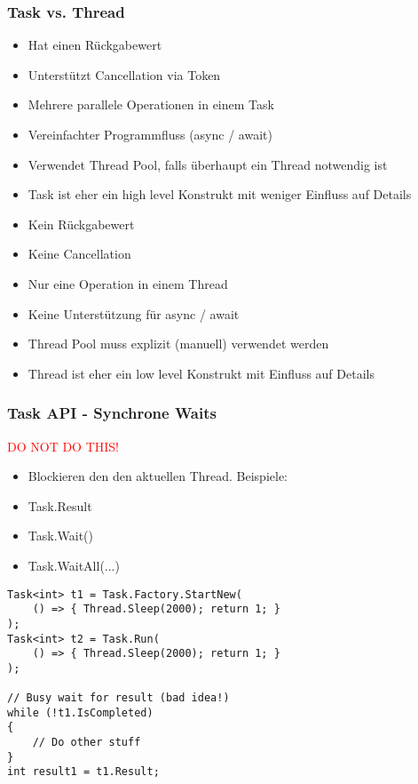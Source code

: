 \begin{multicols*}{2}
\subsubsection{Task vs. Thread}
\begin{multicols*}{2}
\begin{itemize}
    \item Hat einen Rückgabewert
    \item Unterstützt Cancellation via Token
    \item Mehrere parallele Operationen in einem Task
    \item Vereinfachter Programmfluss (async / await)
    \item Verwendet Thread Pool, falls überhaupt ein Thread notwendig ist
    \item Task ist eher ein high level Konstrukt mit weniger Einfluss auf Details
\end{itemize}
\columnbreak
{}
\begin{itemize}
    \item Kein Rückgabewert
    \item Keine Cancellation
    \item Nur eine Operation in einem Thread
    \item Keine Unterstützung für async / await
    \item Thread Pool muss explizit (manuell) verwendet werden
    \item Thread ist eher ein low level Konstrukt mit Einfluss auf Details
\end{itemize}
\end{multicols*}
\subsubsection*{Task API - Synchrone Waits}
\textcolor{red}{DO NOT DO THIS!}
\begin{itemize}
    \item Blockieren den den aktuellen Thread. Beispiele:
    \item Task.Result
    \item Task.Wait()
    \item Task.WaitAll(...)
\end{itemize}
\begin{lstlisting}
Task<int> t1 = Task.Factory.StartNew(
    () => { Thread.Sleep(2000); return 1; }
);
Task<int> t2 = Task.Run(
    () => { Thread.Sleep(2000); return 1; }
);

// Busy wait for result (bad idea!)
while (!t1.IsCompleted)
{
    // Do other stuff
}
int result1 = t1.Result;


\end{lstlisting}
\end{multicols*}

